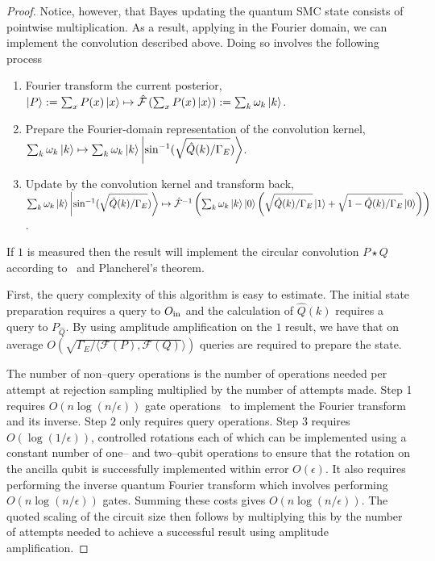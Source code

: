 \documentclass[aps,amsmath,onecolumn,amssymb]{revtex4}
\begin{document}
\begin{proof}
Notice, however, that Bayes updating the quantum SMC state consists of pointwise multiplication. As a result, applying  in the Fourier domain, we can implement the convolution described above.  Doing so involves the following process
\begin{enumerate}
\item  Fourier transform the current posterior, $\left|P\right\rangle:=\sum_x P(x) \left|x\right\rangle \mapsto \hat{\mathcal{F}}\left(\sum_x P(x) \left|x\right\rangle \right):= \sum_k \omega_k \left|k\right\rangle$.
\item Prepare the Fourier-domain representation of the convolution kernel, \\$\sum_k \omega_k \left|k\right\rangle\mapsto \sum_k \omega_k \left|k\right\rangle\left|\sin^{-1}(\sqrt{\hat{Q}(k)/\Gamma_E})\right\rangle$.
\item Update by the convolution kernel and transform back, \\$\sum_k \omega_k \left|k\right\rangle\left|\sin^{-1}(\sqrt{\hat{Q}(k)/\Gamma_E})\right\rangle\mapsto \hat{\mathcal{F}}^{-1}\left(\sum_k \omega_k \left|k\right\rangle\left|0\right\rangle\left(\sqrt{\hat{Q}(k)/\Gamma_E}\left|1\right\rangle+\sqrt{1-\hat{Q}(k)/\Gamma_E}\left|0\right\rangle \right)\right)$.
\end{enumerate}
If $1$ is measured then the result will implement the circular convolution $P \star Q$ according to~ and Plancherel's theorem.

First, the query complexity of this algorithm is easy to estimate.  The initial state preparation requires a query to $O_{\rm in}$ and the calculation of $\hat{Q}(k)$ requires a query to $P_{\hat{Q}}$.  By using amplitude amplification on the $1$ result, we have that on average $O(\sqrt{\Gamma_E/ \langle \mathcal{F}(P), \mathcal{F}(Q)}\rangle)$ queries are required to prepare the state.

The number of non--query operations is the number of operations needed per attempt at rejection sampling multiplied by the number of attempts made.  Step 1 requires $O(n\log(n/\epsilon))$ gate operations~\cite{CW00} to implement the Fourier transform and its inverse.  Step $2$ only requires query operations.  Step $3$ requires $O(\log(1/\epsilon))$, controlled rotations each of which can be implemented using a constant number of one-- and two--qubit operations to ensure that the rotation on the ancilla qubit is successfully implemented within error $O(\epsilon)$.  It also requires performing the inverse quantum Fourier transform which involves performing $O(n\log(n/\epsilon))$ gates.  Summing these costs gives $O(n\log(n/\epsilon))$.  The quoted scaling of the circuit size then follows by multiplying this by the number of attempts needed to achieve a successful result using amplitude amplification.
\end{proof}
\end{document}
